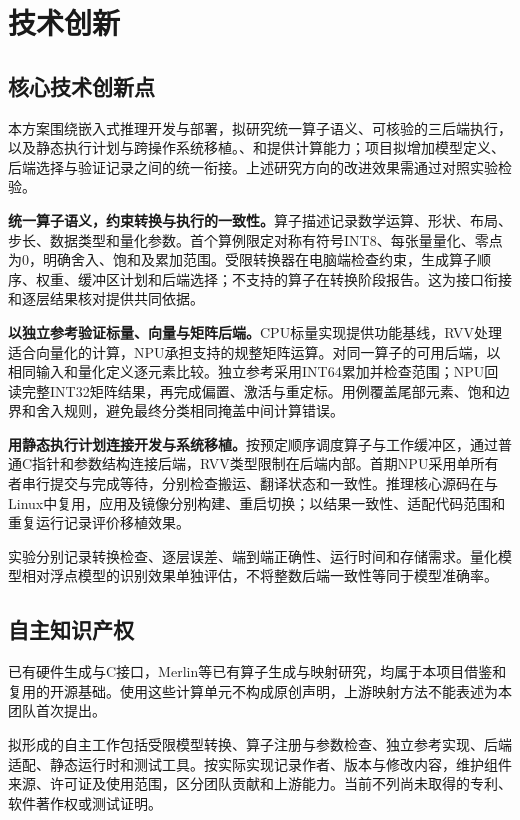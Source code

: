 \section{技术创新}
\subsection{核心技术创新点}

本方案围绕嵌入式推理开发与部署，拟研究统一算子语义、可核验的三后端执行，以及静态执行计划与跨操作系统移植。\ProcessorCore{}、\VectorUnit{}和\AcceleratorName{}提供计算能力；项目拟增加模型定义、后端选择与验证记录之间的统一衔接。上述研究方向的改进效果需通过对照实验检验。\cite{technicalreport}

\textbf{统一算子语义，约束转换与执行的一致性。}算子描述记录数学运算、形状、布局、步长、数据类型和量化参数。首个算例限定对称有符号INT8、每张量量化、零点为0，明确舍入、饱和及累加范围。受限转换器在电脑端检查约束，生成算子顺序、权重、缓冲区计划和后端选择；不支持的算子在转换阶段报告。这为接口衔接和逐层结果核对提供共同依据。

\textbf{以独立参考验证标量、向量与矩阵后端。}CPU标量实现提供功能基线，RVV处理适合向量化的计算，NPU承担支持的规整矩阵运算。对同一算子的可用后端，以相同输入和量化定义逐元素比较。独立参考采用INT64累加并检查范围；NPU回读完整INT32矩阵结果，再完成偏置、激活与重定标。用例覆盖尾部元素、饱和边界和舍入规则，避免最终分类相同掩盖中间计算错误。

\textbf{用静态执行计划连接开发与系统移植。}\RuntimeName{}按预定顺序调度算子与工作缓冲区，通过普通C指针和参数结构连接后端，RVV类型限制在后端内部。首期NPU采用单所有者串行提交与完成等待，分别检查搬运、翻译状态和一致性。推理核心源码在\RealTimeSystem{}与Linux中复用，应用及镜像分别构建、重启切换；以结果一致性、适配代码范围和重复运行记录评价移植效果。

实验分别记录转换检查、逐层误差、端到端正确性、运行时间和存储需求。量化模型相对浮点模型的识别效果单独评估，不将整数后端一致性等同于模型准确率。

\subsection{自主知识产权}

\AcceleratorName{}已有硬件生成与C接口，Merlin等已有算子生成与映射研究，均属于本项目借鉴和复用的开源基础。使用这些计算单元不构成原创声明，上游映射方法不能表述为本团队首次提出。\cite{gemmini,merlin}

拟形成的自主工作包括受限模型转换、算子注册与参数检查、独立参考实现、后端适配、静态运行时和测试工具。按实际实现记录作者、版本与修改内容，维护组件来源、许可证及使用范围，区分团队贡献和上游能力。当前不列尚未取得的专利、软件著作权或测试证明。
